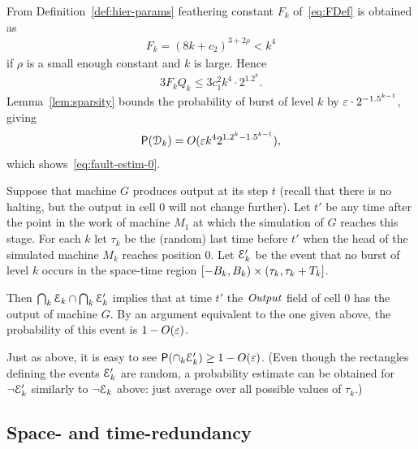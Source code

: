 \documentclass[11pt]{memoir}
\theoremstyle{definition} %
\renewcommand{\le}{\leq}
\renewcommand{\ge}{\geq}
\newcommand{\fld}[1]{\ensuremath{\textit{#1\/}}}
\def\B{B}
\newcommand{\F}{F}
\def\G{G} %
\newcommand{\Q}{Q} %
\newcommand{\Tu}{T}
\newcommand{\Output}{\fld{Output}}
\begin{document}
From Definition~\ref{def:hier-params} feathering constant \( \F_{k} \) of~\eqref{eq:FDef}
is obtained as
 \begin{align*}
 \F_{k}=(8 k + c_{2})^{3+2\rho}<k^{4}
 \end{align*}
 if  \( \rho \) is a small enough constant and \( k \) is large.
Hence
\begin{align*}
  3 \F_{k}\Q_{k} \le 3 c_{1}^{2}k^{4}\cdot 2^{1.2^{k}}.
\end{align*}
Lemma~\ref{lem:sparsity} bounds the probability of burst of level \( k \) by
\( \varepsilon \cdot 2^{-1.5^{k-1}} \), giving
\begin{align*}
   \operatorname{\mathsf P}(\mathcal{D}_{k}) = O(\varepsilon k^{4} 2^{1.2^{k}-1.5^{k-1}}),
\end{align*}
which shows~\eqref{eq:fault-estim-0}.

Suppose that machine \( \G \) produces output at its step \( t \) (recall that there is no halting,
but the output in cell 0 will not change further).
Let \( t' \) be any time after the point in the  work of machine \( M_{1} \)
at which the simulation of \( \G \) reaches this stage.
For each \( k \) let \( \tau_{k} \) be the (random) last time before \( t' \)
when the head of the simulated machine \( M_{k} \) reaches position 0.
Let \( \mathcal{E}'_{k} \) be the event that no burst of level \( k \)
occurs in the space-time region \( \lint{-\B_{k}}{\B_{k}}\times\rint{\tau_{k}}{\tau_{k}+\Tu_{k}} \).

Then \( \bigcap_{k}\mathcal{E}_{k}\cap\bigcap_{k}\mathcal{E}'_{k} \) implies that at time \( t' \) the \( \Output \) field
of cell 0 has the output of machine \( G \).
By an argument equivalent to the one given above, the probability of this event is \( 1-O(\varepsilon) \).

Just as above, it is easy to see \( \Prob(\cap_{k}\cE'_{k})\ge 1-O(\eps) \).
(Even though the rectangles defining the events \( \mathcal{E}'_{k} \) are random,
a probability estimate can be obtained for \( \neg\mathcal{E}'_{k} \) similarly to \( \neg\mathcal{E}_{k} \) above:
just average over all possible values of \( \tau_{k} \).)

 \subsection{Space- and time-redundancy}\label{sec:redundancy}
\end{document}
